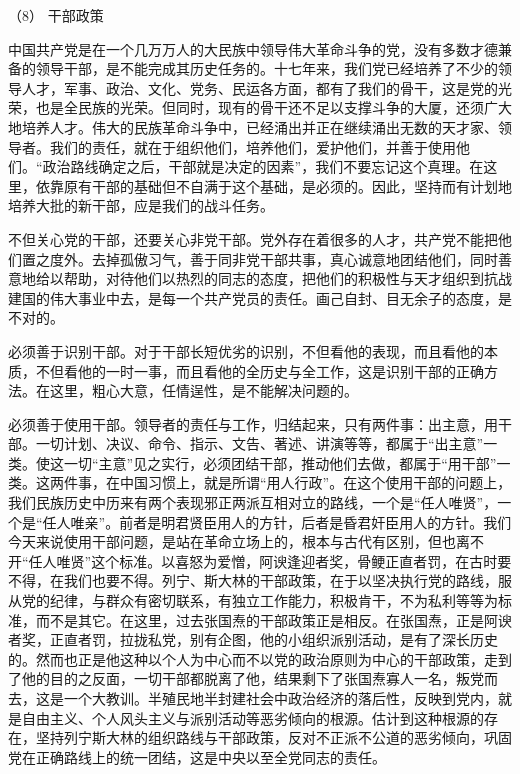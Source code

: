 \documentclass[UTF8, 12pt, a4paper]{ctexrep}
\begin{document}
（8） 干部政策

中国共产党是在一个几万万人的大民族中领导伟大革命斗争的党，没有多数才德兼备的领导干部，是不能完成其历史任务的。十七年来，我们党已经培养了不少的领导人才，军事、政治、文化、党务、民运各方面，都有了我们的骨干，这是党的光荣，也是全民族的光荣。但同时，现有的骨干还不足以支撑斗争的大厦，还须广大地培养人才。伟大的民族革命斗争中，已经涌出并正在继续涌出无数的天才家、领导者。我们的责任，就在于组织他们，培养他们，爱护他们，并善于使用他们。“政治路线确定之后，干部就是决定的因素”，我们不要忘记这个真理。在这里，依靠原有干部的基础但不自满于这个基础，是必须的。因此，坚持而有计划地培养大批的新干部，应是我们的战斗任务。

不但关心党的干部，还要关心非党干部。党外存在着很多的人才，共产党不能把他们置之度外。去掉孤傲习气，善于同非党干部共事，真心诚意地团结他们，同时善意地给以帮助，对待他们以热烈的同志的态度，把他们的积极性与天才组织到抗战建国的伟大事业中去，是每一个共产党员的责任。画己自封、目无余子的态度，是不对的。

必须善于识别干部。对于干部长短优劣的识别，不但看他的表现，而且看他的本质，不但看他的一时一事，而且看他的全历史与全工作，这是识别干部的正确方法。在这里，粗心大意，任情逞性，是不能解决问题的。

必须善于使用干部。领导者的责任与工作，归结起来，只有两件事：出主意，用干部。一切计划、决议、命令、指示、文告、著述、讲演等等，都属于“出主意”一类。使这一切“主意”见之实行，必须团结干部，推动他们去做，都属于“用干部”一类。这两件事，在中国习惯上，就是所谓“用人行政”。在这个使用干部的问题上，我们民族历史中历来有两个表现邪正两派互相对立的路线，一个是“任人唯贤”，一个是“任人唯亲”。前者是明君贤臣用人的方针，后者是昏君奸臣用人的方针。我们今天来说使用干部问题，是站在革命立场上的，根本与古代有区别，但也离不开“任人唯贤”这个标准。以喜怒为爱憎，阿谀逢迎者奖，骨鲠正直者罚，在古时要不得，在我们也要不得。列宁、斯大林的干部政策，在于以坚决执行党的路线，服从党的纪律，与群众有密切联系，有独立工作能力，积极肯干，不为私利等等为标准，而不是其它。在这里，过去张国焘的干部政策正是相反。在张国焘，正是阿谀者奖，正直者罚，拉拢私党，别有企图，他的小组织派别活动，是有了深长历史的。然而也正是他这种以个人为中心而不以党的政治原则为中心的干部政策，走到了他的目的之反面，一切干部都脱离了他，结果剩下了张国焘寡人一名，叛党而去，这是一个大教训。半殖民地半封建社会中政治经济的落后性，反映到党内，就是自由主义、个人风头主义与派别活动等恶劣倾向的根源。估计到这种根源的存在，坚持列宁斯大林的组织路线与干部政策，反对不正派不公道的恶劣倾向，巩固党在正确路线上的统一团结，这是中央以至全党同志的责任。
\end{document}

